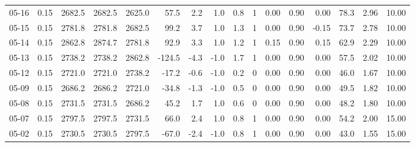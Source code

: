 \begin{threeparttable}
{\begin{tabular}{lrrrrrrrrrrrrrrr}
  05-16 &     0.15 & 2682.5 & 2682.5 & 2625.0 &       57.5 &            2.2 &                      1.0 &                 0.8 &              1 &       0.00 &      0.90 &           0.00 &             78.3 &            2.96 &                  10.00 \\
  05-15 &     0.15 & 2781.8 & 2781.8 & 2682.5 &       99.2 &            3.7 &                      1.0 &                 1.3 &              1 &       0.00 &      0.90 &          -0.15 &             73.7 &            2.78 &                  10.00 \\
  05-14 &     0.15 & 2862.8 & 2874.7 & 2781.8 &       92.9 &            3.3 &                      1.0 &                 1.2 &              1 &       0.15 &      0.90 &           0.15 &             62.9 &            2.29 &                  10.00 \\
  05-13 &     0.15 & 2738.2 & 2738.2 & 2862.8 &     -124.5 &           -4.3 &                     -1.0 &                 1.7 &              1 &       0.00 &      0.90 &           0.00 &             57.5 &            2.02 &                  10.00 \\
  05-12 &     0.15 & 2721.0 & 2721.0 & 2738.2 &      -17.2 &           -0.6 &                     -1.0 &                 0.2 &              0 &       0.00 &      0.90 &           0.00 &             46.0 &            1.67 &                  10.00 \\
  05-09 &     0.15 & 2686.2 & 2686.2 & 2721.0 &      -34.8 &           -1.3 &                     -1.0 &                 0.5 &              0 &       0.00 &      0.90 &           0.00 &             49.5 &            1.82 &                  10.00 \\
  05-08 &     0.15 & 2731.5 & 2731.5 & 2686.2 &       45.2 &            1.7 &                      1.0 &                 0.6 &              0 &       0.00 &      0.90 &           0.00 &             48.2 &            1.80 &                  10.00 \\
  05-07 &     0.15 & 2797.5 & 2797.5 & 2731.5 &       66.0 &            2.4 &                      1.0 &                 0.8 &              1 &       0.00 &      0.90 &           0.00 &             54.2 &            2.00 &                  15.00 \\
  05-02 &     0.15 & 2730.5 & 2730.5 & 2797.5 &      -67.0 &           -2.4 &                     -1.0 &                 0.8 &              1 &       0.00 &      0.90 &           0.00 &             43.0 &            1.55 &                  15.00 \\

\end{tabular}}
\end{threeparttable}
